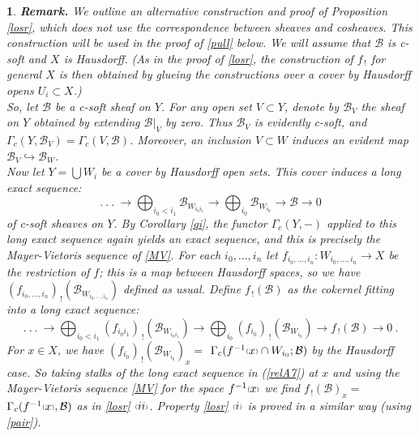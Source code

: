 \documentclass[a4paper]{article}
\newtheorem{num}[st]{}
\newcommand{\rmap}{\longrightarrow}
\newcommand{\B}{\ensuremath{\mathcal{B}}}
\newcommand{\gc}{\ensuremath{\Gamma_c}}
\newcommand{\ps}{{\raise 1pt\hbox{\tiny (}}}
\newcommand{\pd}{{\raise 1pt\hbox{\tiny )}}}
\begin{document}
\begin{num}
\label{rk}
{\bf Remark.}\emph{ We outline an alternative construction and proof of Proposition \ref{losr}, which does not use the correspondence between sheaves and cosheaves. This construction will be used in the proof of \ref{pull} below. We will assume that $\B$ is c-soft and $X$ is Hausdorff. (As in the proof of \ref{losr}, the construction of $f_{\, !}$ for general $X$ is then obtained by glueing the constructions over a cover by Hausdorff opens $U_{i}\subset X$.)\\
\hspace*{.3in} So, let $\B$ be a c-soft sheaf on $Y$. For any open set $V\subset Y$, denote by $\B_{V}$ the sheaf on $Y$ obtained by extending $\B|_{V}$ by zero. Thus $\B_{V}$ is evidently c-soft, and $\gc(Y, \B_{V}) = \gc(V, \B)$. Moreover, an inclusion $V\subset W$ induces an evident map $\B_{V}\hookrightarrow  \B_{W}$.\\
\hspace*{.3in}  Now let $Y= \bigcup W_{i}$ be a cover by Hausdorff open sets. This cover induces a long exact sequence:}
\[ .\ .\ .\ \rmap \bigoplus_{i_{0}< i_{1}} \B_{W_{i_{0}i_{1}}} \rmap \bigoplus_{i_{0}} \B_{W_{i_{0}}} \rmap \B \rmap 0\]
\emph{of c-soft sheaves on $Y$. By Corollary \ref{qi}, the functor $\gc(Y, -)$ applied to this long exact sequence again yields an exact sequence, and this is precisely the Mayer-Vietoris sequence of \ref{MV}. For each $i_{0}, . . . ,i_{n}$ let $f_{i_{0}, . . . ,i_{n}}: W_{i_{0}, . . . ,i_{n}}\rmap X$ be the restriction of $f$; this is a map between Hausdorff spaces, so we have $(f_{i_{0}, . . . ,i_{n}})_{\, !}(\B_{W_{i_{0}, . . . ,i_{n}}})$ defined as usual. Define $f_{\, !}(\B)$ as the cokernel fitting into a long exact sequence:}
\begin{equation}
\label{relA7}
 .\ .\ .\ \rmap \bigoplus_{i_{0}< i_{1}} (f_{i_{0}i_{1}})_{\, !}(\B_{W_{i_{0}i_{1}}}) \rmap \bigoplus_{i_{0}} (f_{i_{0}})_{\, !}(\B_{W_{i_{0}}}) \rmap f_{\, !}(\B) \rmap 0\ .
\end{equation}
\emph{\hspace*{.3in}For $ x\in X$, we have $(f_{i_{0}})_{\, !}(\B_{W_{i_{0}}})_{x}=$ $\gc (f^{-1}\ps x\pd \cap W_{i_{0}}; \B)$ by the Hausdorff case. So taking stalks of the long exact sequence in (\ref{relA7}) at $x$ and using the Mayer-Vietoris sequence \ref{MV} for the space $f^{-1}\ps x\pd$ we find $f_{\, !}(\B)_{x}=$ $\gc (f^{-1}\ps x\pd, \B)$ as in \ref{losr} 
$\ps ii\pd $. Property \ref{losr} $\ps i\pd$ is proved in a similar way (using \ref{pair}).\\
}
\end{num}
\end{document}
